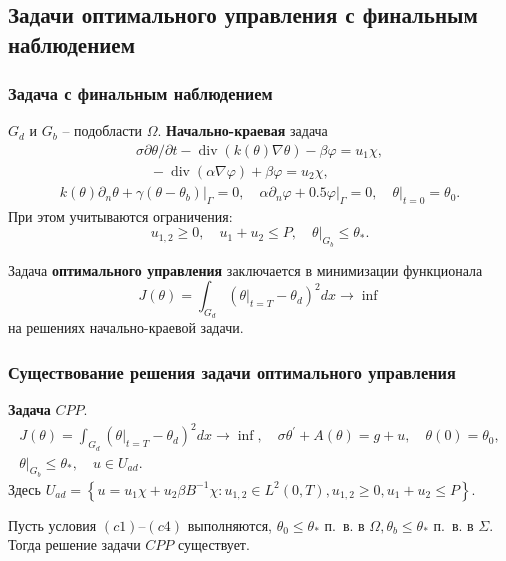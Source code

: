 \subsection{Задачи оптимального управления с финальным наблюдением}\label{subsec:final-check}
\begin{frame}
    \frametitle{Задача с финальным наблюдением}
    $G_{d}$ и $G_{b}$ -- подобласти $\Omega$.
    \textbf{Начально-краевая} задача
    \begin{gather}
        \label{eq:3_3:1}
        \sigma \partial \theta / \partial t-\operatorname{div}(k(\theta) \nabla \theta)
        -\beta \varphi=u_{1} \chi, \\
        \quad-\operatorname{div}(\alpha \nabla \varphi)+\beta \varphi= u_{2} \chi,
    \end{gather}
    \begin{gather}
        \label{eq:3_3:2}
        k(\theta) \partial_{n} \theta+\left.\gamma
        \left(\theta-\theta_{b}\right)\right|_{\Gamma}=0,
        \quad \alpha \partial_{n} \varphi +
        \left.0.5 \varphi\right|_{\Gamma}=0,\left.\quad \theta\right|_{t=0}=\theta_{0}.
    \end{gather}
    При этом учитываются ограничения:
    \[
        u_{1,2} \geq 0, \quad u_{1}+u_{2} \leq P,\left.\quad \theta\right|_{G_{b}} \leq \theta_{*}.
    \]

    Задача \textbf{оптимального управления} заключается в минимизации функционала
    \[
        J(\theta)=\int_{G_{d}}\left(\left.\theta\right|_{t=T}
        -\theta_{d}\right)^{2} d x \rightarrow \inf
    \]
    на решениях начально-краевой задачи.
\end{frame}

\begin{frame}
    \frametitle{Существование решения задачи оптимального управления}
    \textbf{Задача} $CPP$.
    \[
        \begin{gathered}
            J(\theta)=\int_{G_{d}}\left(\left.\theta\right|_{t=T}
            - \theta_{d}\right)^{2} d x \rightarrow \inf,
            \quad \sigma \theta^{\prime}+A(\theta)=g+u, \quad \theta(0)=\theta_{0}, \\
            \left.\theta\right|_{G_{b}} \leq \theta_{*}, \quad u \in U_{a d}.
        \end{gathered}
    \]
    Здесь
    $U_{a d}=\left\{u=u_{1} \chi+u_{2} \beta B^{-1} \chi: u_{1,2} \in L^{2}(0, T), u_{1,2}
    \geq 0, u_{1}+u_{2} \leq P\right\}$.

    \begin{theorem}[3.4]
        \label{th:3_3:1}
        Пусть условия $(c1)$--$(c4)$ выполняются,
        $\theta_{0} \leq \theta_{*}$ п.\ в. в $\Omega, \theta_{b} \leq \theta_{*}$ п.\ в. в $\Sigma$.
        Тогда решение задачи $CPP$ существует.
    \end{theorem}
\end{frame}

